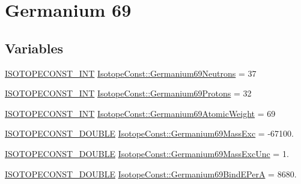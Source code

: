 \hypertarget{group___isotope_const-_germanium-_ge69}{}\section{Germanium 69}
\label{group___isotope_const-_germanium-_ge69}
\subsection*{Variables}
\begin{DoxyCompactItemize}
\item 
\mbox{\hyperlink{group___isotope_const-_macros_ga5f18360b3e99483a35c32d789e62621c}{I\+S\+O\+T\+O\+P\+E\+C\+O\+N\+S\+T\+\_\+\+I\+NT}} \mbox{\hyperlink{group___isotope_const-_germanium-_ge69_gaa84972b8cf15725f3a7158dd05d8baa8}{Isotope\+Const\+::\+Germanium69\+Neutrons}} = 37
\item 
\mbox{\hyperlink{group___isotope_const-_macros_ga5f18360b3e99483a35c32d789e62621c}{I\+S\+O\+T\+O\+P\+E\+C\+O\+N\+S\+T\+\_\+\+I\+NT}} \mbox{\hyperlink{group___isotope_const-_germanium-_ge69_gabbbdbbf5953514ebcd2d71e3b439b4e6}{Isotope\+Const\+::\+Germanium69\+Protons}} = 32
\item 
\mbox{\hyperlink{group___isotope_const-_macros_ga5f18360b3e99483a35c32d789e62621c}{I\+S\+O\+T\+O\+P\+E\+C\+O\+N\+S\+T\+\_\+\+I\+NT}} \mbox{\hyperlink{group___isotope_const-_germanium-_ge69_ga1f1afdd81c320a9a5b3c706e7493b7f1}{Isotope\+Const\+::\+Germanium69\+Atomic\+Weight}} = 69
\item 
\mbox{\hyperlink{group___isotope_const-_macros_ga8f45a7272ce02c0b4c65c44636ed719a}{I\+S\+O\+T\+O\+P\+E\+C\+O\+N\+S\+T\+\_\+\+D\+O\+U\+B\+LE}} \mbox{\hyperlink{group___isotope_const-_germanium-_ge69_gae4d06bbc58cd9d3b1b71b9b6b6f66bdb}{Isotope\+Const\+::\+Germanium69\+Mass\+Exc}} = -\/67100.
\item 
\mbox{\hyperlink{group___isotope_const-_macros_ga8f45a7272ce02c0b4c65c44636ed719a}{I\+S\+O\+T\+O\+P\+E\+C\+O\+N\+S\+T\+\_\+\+D\+O\+U\+B\+LE}} \mbox{\hyperlink{group___isotope_const-_germanium-_ge69_ga9ed158efd7ff6d7a151b1740c6742a25}{Isotope\+Const\+::\+Germanium69\+Mass\+Exc\+Unc}} = 1.
\item 
\mbox{\hyperlink{group___isotope_const-_macros_ga8f45a7272ce02c0b4c65c44636ed719a}{I\+S\+O\+T\+O\+P\+E\+C\+O\+N\+S\+T\+\_\+\+D\+O\+U\+B\+LE}} \mbox{\hyperlink{group___isotope_const-_germanium-_ge69_ga6b82a0d339d9165d62a53ce36e38e439}{Isotope\+Const\+::\+Germanium69\+Bind\+E\+PerA}} = 8680.
\item 

\end{DoxyCompactItemize}
